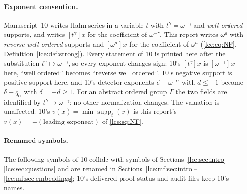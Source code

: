 \documentclass[11pt,letterpaper]{article}
\numberwithin{equation}{section}
\theoremstyle{definition}
\theoremstyle{remark}
\newcommand{\supp}{\operatorname{supp}}
\newcommand{\coef}[2]{[\omega^{#1}]\,#2}
\begin{document}
\paragraph{Exponent convention.} Manuscript~10 writes Hahn series in a
variable $t$ with $t^\gamma=\omega^{-\gamma}$ and \emph{well-ordered}
supports, and writes $[t^\gamma]x$ for the coefficient of
$\omega^{-\gamma}$. This report writes $\omega^a$ with \emph{reverse
well-ordered} supports and $\coef ax$ for the coefficient of $\omega^a$
(\eqref{lce:eq:NF}, Definition~\ref{lce:def:strong}). Every statement of 10
is printed here after the substitution $t^\gamma\mapsto\omega^{-\gamma}$,
so every exponent changes sign: 10's $[t^\gamma]x$ is $\coef{-\gamma}{x}$
here, ``well ordered'' becomes ``reverse well ordered'', 10's negative
support is positive support here, and 10's detector exponents
$d-\omega^{-\alpha}$ with $d\le-1$ become $\delta+q_\alpha$ with
$\delta=-d\ge1$. For an abstract ordered group $\Gamma$ the two fields are
identified by $t^\gamma\mapsto\omega^{-\gamma}$; no other normalization
changes. The valuation is unaffected: 10's $v(x)=\min\supp_t(x)$ is this
report's $v(x)=-(\text{leading exponent})$ of \eqref{lce:eq:NF}.

\paragraph{Renamed symbols.} The following symbols of 10 collide with
symbols of Sections~\ref{lce:sec:intro}--\ref{lce:sec:questions} and are
renamed in Sections~\ref{lce:mf:sec:intro}--\ref{lce:mf:sec:embeddings};
10's delivered proof-status and audit files keep 10's names.
\end{document}
